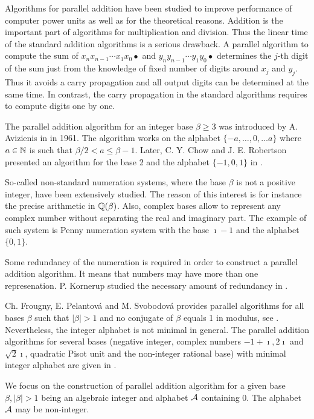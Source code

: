 Algorithms for parallel addition have been studied to improve performance of computer power units as well as for the theoretical reasons. Addition is the important part of algorithms for multiplication and division. Thus the linear time of the standard addition algorithms is a serious drawback. A parallel algorithm to compute the sum of $x_n x_{n-1}\cdots x_1 x_0 \bullet$ and $y_n y_{n-1}\cdots y_1 y_0 \bullet$ determines the $j$-th digit of the sum just from the knowledge of fixed number of digits around $x_j$ and $y_j$. Thus it avoids a carry propagation and all output digits can be determined at the same time. In contrast, the carry propagation in the standard algorithms requires to compute digits one by one.

The parallel addition algorithm for an integer base $\beta\geq3$ was introduced by A. Avizienis in \cite{avizienis} in 1961. The algorithm works on the alphabet $\{-a, \dots, 0, \dots a\}$ where $a\in\mathbb{N}$ is such that $\beta/2 <a \leq \beta-1$. Later, C. Y. Chow and J. E. Robertson presented an algorithm for the base 2 and the alphabet $\{-1,0,1\}$ in \cite{chow}.   

So-called non-standard numeration systems, where the base $\beta$ is not a positive integer, have been extensively studied. The reason of this interest is for instance the precise arithmetic in $\mathbb{Q}(\beta)$. Also, complex bases allow to represent any complex number without separating the real and imaginary part. The example of such system is Penny numeration system with the base $\imath -1$ and the alphabet $\{0,1\}$.

Some redundancy of the numeration is required in order to construct a parallel addition algorithm. It means that numbers may have more than one represenation. P. Kornerup studied the necessary amount of redundancy in \cite{kornerup}. 

Ch. Frougny, E. Pelantov\'a and M. Svobodov\'a provides parallel algorithms for all bases $\beta$ such that $|\beta|>1$ and no conjugate of $\beta$ equals 1 in modulus, see \cite{parAddNS}. Nevertheless, the integer alphabet is not minimal in general.
 The parallel addition algorithms for several bases (negative integer, complex numbers $-1+\imath, 2\imath$ and $\sqrt{2}\imath$, quadratic Pisot unit and the non-integer rational base) with minimal integer alphabet are given in \cite{minAlph}.
 

We focus on the construction of parallel addition algorithm for a given base $\beta, |\beta|>1$ being an algebraic integer and alphabet $\mathcal{A}$ containing 0. The alphabet $\mathcal{A}$ may be non-integer. 

